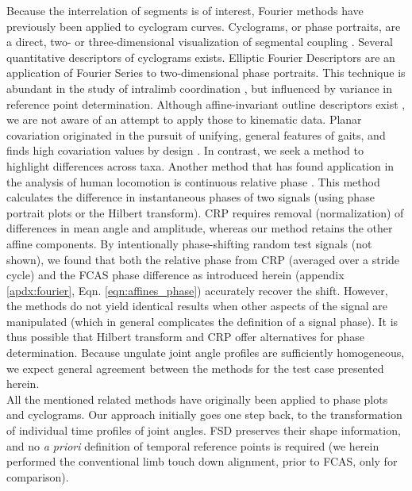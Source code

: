 \documentclass[10pt, a4paper]{article}
\begin{document}
Because the interrelation of segments is of interest, Fourier methods have previously been applied to cyclogram curves. 
Cyclograms, or phase portraits, are a direct, two- or three-dimensional visualization of segmental coupling \citep{Bernstein1934,Goswami1998,DAout2002}. 
Several quantitative descriptors of cyclograms exists. 
Elliptic Fourier Descriptors \citep{Kuhl1982,Wheat2006} are an application of Fourier Series to two-dimensional phase portraits. 
This technique is abundant in the study of intralimb coordination \citep[e.g.][]{Polk2008,HsiaoWecksler2010,Rosengren2009}, but influenced by variance in reference point determination. 
Although affine-invariant outline descriptors exist \citep[e.g.][]{Arbter1990}, we are not aware of an attempt to apply those to kinematic data. 
Planar covariation \citep{Borghese1996,Hallemans2009,Ogihara2014} originated in the pursuit of unifying, general features of gaits, and finds high covariation values by design \citep[choice of segment angles, common temporal swing/stance structure for these, use of PCA;][]{Hicheur2006,Ivanenko2008}. 
In contrast, we seek a method to highlight differences across taxa. 
Another method that has found application in the analysis of human locomotion is continuous relative phase \citep[CRP, \textit{cf.}][]{Lamb2014}. 
This method calculates the difference in instantaneous phases of two signals (using phase portrait plots or the Hilbert transform). 
CRP requires removal (normalization) of differences in mean angle and amplitude, whereas our method retains the other affine components. 
By intentionally phase-shifting random test signals (not shown), we found that both the relative phase from CRP (averaged over a stride cycle) and the FCAS phase difference as introduced herein (appendix \ref{apdx:fourier}, Eqn. \ref{eqn:affines_phase}) accurately recover the shift. 
However, the methods do not yield identical results when other aspects of the signal are manipulated (which in general complicates the definition of a signal phase). 
It is thus possible that Hilbert transform and CRP offer alternatives for phase determination. 
Because ungulate joint angle profiles are sufficiently homogeneous, we expect general agreement between the methods for the test case presented herein. 
\\All the mentioned related methods have originally been applied to phase plots and cyclograms. 
Our approach initially goes one step back, to the transformation of individual time profiles of joint angles. 
FSD preserves their shape information, and no \textit{a priori} definition of temporal reference points is required (we herein performed the conventional limb touch down alignment, prior to FCAS, only for comparison). 
\end{document}
